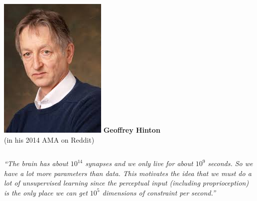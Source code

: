 \begin{frame}{}
    \begin{center}
    \begin{minipage}{0.9\textwidth}
        \begin{columns}
                \includegraphics[width=0.8\linewidth]{images/dul/slide_15_1_img.png}
                \centering
                \textbf{Geoffrey Hinton}\\
                (in his 2014 AMA on Reddit)
        \end{columns}
        \vspace{1em}
        \begin{center}
        \textit{“The brain has about $10^{14}$ synapses and we only live for about $10^{9}$ seconds. 
        So we have a lot more parameters than data. This motivates the idea that we must do a lot of 
        unsupervised learning since the perceptual input (including proprioception) is the only place 
        we can get $10^{5}$ dimensions of constraint per second.”}
        \end{center}
    \end{minipage}
    \end{center}
\end{frame}


